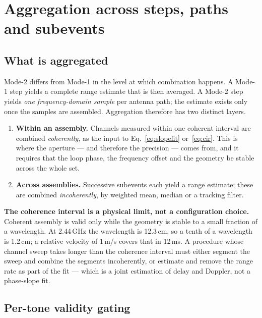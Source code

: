 \documentclass[11pt,a4paper]{article}
\begin{document}
\section{Aggregation across steps, paths and subevents}
\label{sec:agg}

\subsection{What is aggregated}

Mode-2 differs from Mode-1 in the level at which combination happens. A Mode-1 step yields a complete
range estimate that is then averaged. A Mode-2 step yields \emph{one frequency-domain sample} per
antenna path; the estimate exists only once the samples are assembled. Aggregation therefore has two
distinct layers.

\begin{enumerate}[leftmargin=1.6em,itemsep=1pt]
  \item \textbf{Within an assembly.} Channels measured within one coherent interval are combined
    \emph{coherently}, as the input to Eq.~\eqref{eq:slopefit} or~\eqref{eq:cir}. This is where the
    aperture --- and therefore the precision --- comes from, and it requires that the loop phase,
    the frequency offset and the geometry be stable across the whole set.
  \item \textbf{Across assemblies.} Successive subevents each yield a range estimate; these are
    combined \emph{incoherently}, by weighted mean, median or a tracking filter.
\end{enumerate}

\begin{callout}
\textbf{The coherence interval is a physical limit, not a configuration choice.} Coherent assembly is
valid only while the geometry is stable to a small fraction of a wavelength. At 2.44\,GHz the
wavelength is 12.3\,cm, so a tenth of a wavelength is 1.2\,cm; a relative velocity of $1$\,m/s covers
that in 12\,ms. A procedure whose channel sweep takes longer than the coherence interval must either
segment the sweep and combine the segments incoherently, or estimate and remove the range rate as
part of the fit --- which is a joint estimation of delay and Doppler, not a phase-slope fit.
\end{callout}

\subsection{Per-tone validity gating}
\end{document}
